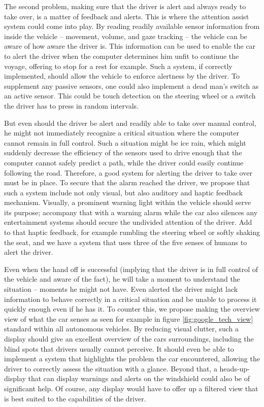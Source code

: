 \documentclass{acm_proc_article-sp}
\begin{document}
The second problem, making sure that the driver is alert and always ready to take over, is a matter of feedback and alerts.
This is where the attention assist system could come into play.
By reading readily available sensor information from inside the vehicle – movement, volume, and gaze tracking – the vehicle can be aware of how aware the driver is.
This information can be used to enable the car to alert the driver when the computer determines him unfit to continue the voyage, offering to stop for a rest for example.
Such a system, if correctly implemented, should allow the vehicle to enforce alertness by the driver.
To supplement any passive sensors, one could also implement a dead man's switch as an active sensor.
This could be touch detection on the steering wheel or a switch the driver has to press in random intervals.

But even should the driver be alert and readily able to take over manual control, he might not immediately recognize a critical situation where the computer cannot remain in full control.
Such a situation might be ice rain, which might suddenly decrease the efficiency of the sensors used to drive enough that the computer cannot safely predict a path, while the driver could easily continue following the road.
Therefore, a good system for alerting the driver to take over must be in place.
To secure that the alarm reached the driver, we propose that such a system include not only visual, but also auditory and haptic feedback mechanism.
Visually, a prominent warning light within the vehicle should serve its purpose; accompany that with a warning alarm while the car also silences any entertainment systems should secure the undivided attention of the driver.
Add to that haptic feedback, for example rumbling the steering wheel or softly shaking the seat, and we have a system that uses three of the five senses of humans to alert the driver.

Even when the hand off is successful (implying that the driver is in full control of the vehicle and aware of the fact), he will take a moment to understand the situation – moments he might not have.
Even alerted the driver might lack information to behave correctly in a critical situation and be unable to process it quickly enough even if he has it.
To counter this, we propose making the overview view of what the car senses as seen for example in figure \ref{fig:google_tech_view} standard within all autonomous vehicles.
By reducing visual clutter, such a display should give an excellent overview of the cars surroundings, including the blind spots that drivers usually cannot perceive.
It should even be able to implement a system that highlights the problem the car encountered, allowing the driver to correctly assess the situation with a glance.
Beyond that, a heads-up-display that can display warnings and alerts on the windshield could also be of significant help.
Of course, any display would have to offer up a filtered view that is best suited to the capabilities of the driver.
\end{document}
